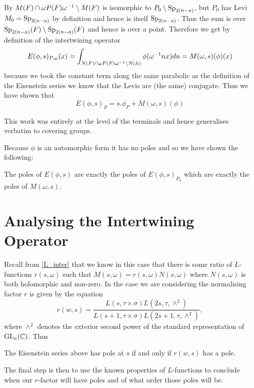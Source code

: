      By \cite[2C]{jiangPolesCertainResidual2013} \(M(F)\cap \omega P(F)\omega^{-1} \setminus M(F)\) is isomorphic to \(P_0 \setminus \operatorname{Sp}_{2(n-a)}\), but \(P_0\) has Levi \(M_0 = \operatorname{Sp}_{2(n-a)}\) by definition and hence is itself \(\operatorname{Sp}_{2(n-a)}\). Thus the sum is over \(\operatorname{Sp}_{2(n-a)}(F) \setminus \operatorname{Sp}_{2(n-a)}(F)\) and hence is over a point. Therefore we get by definition of the intertwining operator
     \[E(\phi, s)_{P, \omega}(x) = \int_{N(F)\cap \omega P(F)\omega\inv \setminus N(\A)} \phi( \omega\inv n x)  dn = M(\omega, s)(\phi)(x)\]
     because we took the constant term along the same parabolic as the definition of the Eisenstein series we know that the Levis are (the same) conjugate.
    Thus we have shown that 
    \[E(\phi, s)_P = s.\phi_P + M(\omega, s )(\phi)\]
    \begin{remark}
        This work was entirely at the level of the terminals and hence generalises verbatim to covering groups.
    \end{remark}
    
    Because \(\phi\) is an automorphic form it has no poles and so we have shown the following:
    \begin{Lemma}
        The poles of \(E(\phi, s)\) are exactly the poles of \(E(\phi,s)_{P_a}\) which are exactly the poles of \(M(\omega, s)\).
    \end{Lemma}

    \section{Analysing the Intertwining Operator}
    Recall from \ref{L_inter} that we know in this case that there is some ratio of \(L\)-functions \(r(s, \omega)\) such that \(M(s,\omega) = r(s, \omega)N(s, \omega)\) where \(N(s, \omega)\) is both holomorphic and non-zero. 
     In the case we are considering the normalising factor \(r\) is given by the equation \cite[4A]{jiangPolesCertainResidual2013}
     \[r(w, s) = \frac{L(s, \tau\times \sigma)L(2s, \tau,\wedge^2)}{L(s+1, \tau\times \sigma)L(2s+1, \tau, \wedge^2)},\]
    where \(\wedge^2\) denotes the exterior second power of the standard representation of \(\GL_a(\C)\). Thus

     \begin{Lemma}
        The Eisenstein series above has pole at \(s\) if and only if \(r(w,s)\) has a pole.
     \end{Lemma}
     The final step is then to use the known properties of \(L\)-functions to conclude when our \(r\)-factor will have poles and of what order those poles will be.

